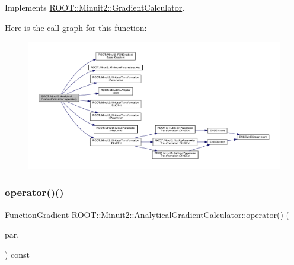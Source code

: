 Implements \mbox{\hyperlink{classROOT_1_1Minuit2_1_1GradientCalculator_a1bae913e96ffc9ece28664a5f6f79cb0}{R\+O\+O\+T\+::\+Minuit2\+::\+Gradient\+Calculator}}.

Here is the call graph for this function\+:
\nopagebreak
\begin{figure}[H]
\begin{center}
\leavevmode
\includegraphics[width=350pt]{dd/d3a/classROOT_1_1Minuit2_1_1AnalyticalGradientCalculator_aff4787568d15aaf6dac1c8ffa1bd9db7_cgraph}
\end{center}
\end{figure}
\mbox{\label{classROOT_1_1Minuit2_1_1AnalyticalGradientCalculator_ad16442d24717c36e7d32897a2f8951c0}} 
\subsubsection{\texorpdfstring{operator()()}{operator()()}\hspace{0.1cm}{\footnotesize\ttfamily [4/6]}}
{\footnotesize\ttfamily \mbox{\hyperlink{classROOT_1_1Minuit2_1_1FunctionGradient}{Function\+Gradient}} R\+O\+O\+T\+::\+Minuit2\+::\+Analytical\+Gradient\+Calculator\+::operator() (\begin{DoxyParamCaption}\item[{const \mbox{\hyperlink{classROOT_1_1Minuit2_1_1MinimumParameters}{Minimum\+Parameters}} \&}]{par,  }\item[{const \mbox{\hyperlink{classROOT_1_1Minuit2_1_1FunctionGradient}{Function\+Gradient}} \&}]{ }\end{DoxyParamCaption}) const\hspace{0.3cm}{\ttfamily [virtual]}}



